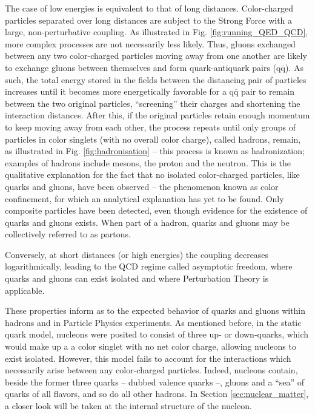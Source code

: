 The case of low energies is equivalent to that of long distances. Color-charged particles separated over long distances are subject to the Strong Force with a large, non-perturbative coupling. As illustrated in Fig. \ref{fig:running_QED_QCD}, more complex processes are not necessarily less likely. Thus, gluons exchanged between any two color-charged particles moving away from one another are likely to exchange gluons between themselves and form quark-antiquark pairs ($\text{q}\overline{\text{q}}$). As such, the total energy stored in the fields between the distancing pair of particles increases until it becomes more energetically favorable for a $\text{q}\overline{\text{q}}$ pair to remain between the two original particles, ``screening'' their charges and shortening the interaction distances. After this, if the original particles retain enough momentum to keep moving away from each other, the process repeats until only groups of particles in color singlets (with no overall color charge), called hadrons, remain, as illustrated in Fig. \ref{fig:hadronisation} -- this process is known as hadronization; examples of hadrons include mesons, the proton and the neutron. This is the qualitative explanation for the fact that no isolated color-charged particles, like quarks and gluons, have been observed -- the phenomenon known as color confinement, for which an analytical explanation has yet to be found. Only composite particles have been detected, even though evidence for the existence of quarks and gluons exists. When part of a hadron, quarks and gluons may be collectively referred to as partons.

Conversely, at short distances (or high energies) the coupling decreases logarithmically, leading to the	 \gls{QCD} regime called asymptotic freedom, where quarks and gluons can exist isolated and where Perturbation Theory is applicable.

These properties inform as to the expected behavior of quarks and gluons within hadrons and in Particle Physics experiments. As mentioned before, in the static quark model, nucleons were posited to consist of three up- or down-quarks, which would make up a a color singlet with no net color charge, allowing nucleons to exist isolated. However, this model fails to account for the interactions which necessarily arise between any color-charged particles. Indeed, nucleons contain, beside the former three quarks --  dubbed valence quarks --, gluons and a ``sea'' of quarks of all flavors, and so do all other hadrons. In Section \ref{sec:nuclear_matter}, a closer look will be taken at the internal structure of the nucleon.


